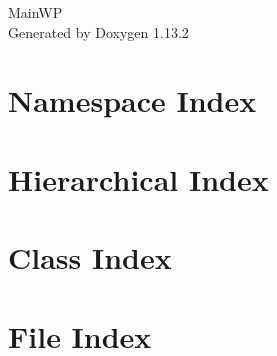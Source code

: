 \documentclass[twoside]{book}
\newcommand{\+}{\discretionary{\mbox{\scriptsize$\hookleftarrow$}}{}{}}
\newcommand{\clearemptydoublepage}{%
    \newpage{\pagestyle{empty}\cleardoublepage}%
  }
\begin{document}
  \raggedbottom
    \hypersetup{pageanchor=false,
                bookmarksnumbered=true,
                pdfencoding=unicode
               }
  \begin{titlepage}
  \vspace*{7cm}
  \begin{center}%
  {\Large Main\+WP}\\
  \vspace*{1cm}
  {\large Generated by Doxygen 1.13.2}\\
  \end{center}
  \end{titlepage}
  \clearemptydoublepage
  \tableofcontents
  \clearemptydoublepage
  \hypersetup{pageanchor=true}






\chapter{Namespace Index}

\chapter{Hierarchical Index}

\chapter{Class Index}

\chapter{File Index}

\end{document}
